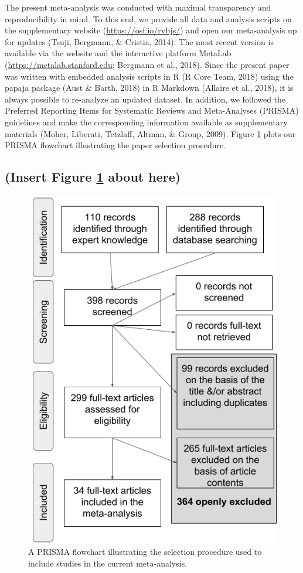 \documentclass[man]{apa6}
\begin{document}
The present meta-analysis was conducted with maximal transparency and reproducibility in mind. To this end, we provide all data and analysis scripts on the supplementary website (\url{https://osf.io/rvbjs/}) and open our meta-analysis up for updates (Tsuji, Bergmann, \& Cristia, 2014). The most recent version is available via the website and the interactive platform MetaLab (\url{https://metalab.stanford.edu}; Bergmann et al., 2018). Since the present paper was written with embedded analysis scripts in R (R Core Team, 2018) using the papaja package (Aust \& Barth, 2018) in R Markdown (Allaire et al., 2018), it is always possible to re-analyze an updated dataset. In addition, we followed the Preferred Reporting Items for Systematic Reviews and Meta-Analyses (PRISMA) guidelines and make the corresponding information available as supplementary materials (Moher, Liberati, Tetzlaff, Altman, \& Group, 2009). Figure \ref{fig:PRISMA-image} plots our PRISMA flowchart illustrating the paper selection procedure.

\hypertarget{insert-figure-reffigprisma-image-about-here}{%
\subsection{(Insert Figure \ref{fig:PRISMA-image} about here)}\label{insert-figure-reffigprisma-image-about-here}}

\begin{figure}
\centering
\includegraphics{figures/Figure_1_PRISMA_MA_Mispronunciation.png}
\caption{\label{fig:PRISMA-image}A PRISMA flowchart illustrating the selection procedure used to include studies in the current meta-analysis.}
\end{figure}
\end{document}
